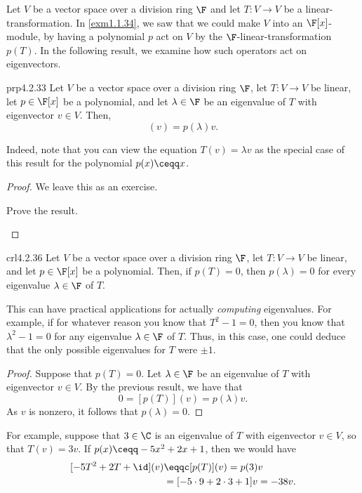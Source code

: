 Let $V$ be a vector space over a division ring $\F$ and let $T\colon V\rightarrow V$ be a linear-transformation.  In \cref{exm1.1.34}, we saw that we could make $V$ into an $\F [x]$-module, by having a polynomial $p$ act on $V$ by the $\F$-linear-transformation $p(T)$.  In the following result, we examine how such operators act on eigenvectors.
\begin{prp}{}{prp4.2.33}
	Let $V$ be a vector space over a division ring $\F$, let $T\colon V\rightarrow V$ be linear, let $p\in \F [x]$ be a polynomial, and let $\lambda \in \F$ be an eigenvalue of $T$ with eigenvector $v\in V$.  Then,
	\begin{equation}
		[p(T)](v)=p(\lambda )v.
	\end{equation}
	\begin{rmk}
		Indeed, note that you can view the equation $T(v)=\lambda v$ as the special case of this result for the polynomial $p(x)\ceqq x$.
	\end{rmk}
	\begin{proof}
		We leave this as an exercise.
		\begin{exr}[breakable=false]{}{}
			Prove the result.
		\end{exr}
	\end{proof}
\end{prp}
\begin{crl}{}{crl4.2.36}
	Let $V$ be a vector space over a division ring $\F$, let $T\colon V\rightarrow V$ be linear, and let $p\in \F [x]$ be a polynomial.  Then, if $p(T)=0$, then $p(\lambda )=0$ for every eigenvalue $\lambda \in \F$ of $T$.
	\begin{rmk}
		This can have practical applications for actually \emph{computing} eigenvalues.  For example, if for whatever reason you know that $T^2-1=0$, then you know that $\lambda ^2-1=0$ for any eigenvalue $\lambda \in \F$ of $T$.  Thus, in this case, one could deduce that the only possible eigenvalues for $T$ were $\pm 1$.
	\end{rmk}
	\begin{proof}
		Suppose that $p(T)=0$.  Let $\lambda \in \F$ be an eigenvalue of $T$ with eigenvector $v\in V$.  By the previous result, we have that
		\begin{equation}
			0=[p(T)](v)=p(\lambda )v.
		\end{equation}
		As $v$ is nonzero, it follows that $p(\lambda )=0$.
	\end{proof}
\end{crl}
\begin{exm}{}{}
	For example, suppose that $3\in \C$ is an eigenvalue of $T$ with eigenvector $v\in V$, so that $T(v)=3v$.  If $p(x)\ceqq -5x^2+2x+1$, then we would have
	\begin{equation}
		\begin{split}
			[-5T^2+2T+\id ](v) & \eqqc [p(T)](v)=p(3)v \\
			& =[-5\cdot 9+2\cdot 3+1]v=-38v.
		\end{split}
	\end{equation}
\end{exm}

